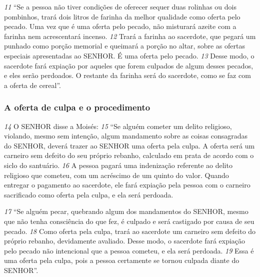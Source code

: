 \smallskip
\textit{\tiny 11}
“Se a pessoa não tiver condições de oferecer sequer duas rolinhas ou dois
pombinhos, trará dois litros de farinha da melhor qualidade como oferta pelo
pecado. Uma vez que é uma oferta pelo pecado, não misturará azeite com a
farinha nem acrescentará incenso. 
\textit{\tiny 12}
Trará a farinha ao sacerdote, que pegará um
punhado como porção memorial e queimará a porção no altar, sobre as ofertas
especiais apresentadas ao SENHOR. É uma oferta pelo pecado. 
\textit{\tiny 13}
Desse modo, o
sacerdote fará expiação por aqueles que forem culpados de algum desses
pecados, e eles serão perdoados. O restante da farinha será do sacerdote, como se
faz com a oferta de cereal”.

\bigskip
\subsubsection*{A oferta de culpa e o procedimento}
\textit{\tiny 14}
O SENHOR disse a Moisés: 
\textit{\tiny 15}
“Se alguém cometer um delito religioso, violando,
mesmo sem intenção, algum mandamento sobre as coisas consagradas do SENHOR,
deverá trazer ao SENHOR uma oferta pela culpa. 
A oferta será um carneiro sem
defeito do seu próprio rebanho, calculado em prata de acordo com o siclo do
santuário. 
\textit{\tiny 16}
A pessoa pagará uma indenização referente ao delito religioso que
cometeu, com um acréscimo de um quinto do valor. Quando entregar o
pagamento ao sacerdote, ele fará expiação pela pessoa com o carneiro sacrificado
como oferta pela culpa, e ela será perdoada.
  
\smallskip
\textit{\tiny 17}
“Se alguém pecar, quebrando algum dos mandamentos do SENHOR, mesmo
que não tenha consciência do que fez, é culpado e será castigado por causa de seu
pecado. 
\textit{\tiny 18}
Como oferta pela culpa, trará ao sacerdote um carneiro sem defeito do
próprio rebanho, devidamente avaliado. Desse modo, o sacerdote fará expiação
pelo pecado não intencional que a pessoa cometeu, e ela será perdoada. 
\textit{\tiny 19}
Essa é
uma oferta pela culpa, pois a pessoa certamente se tornou culpada diante do
SENHOR”.

